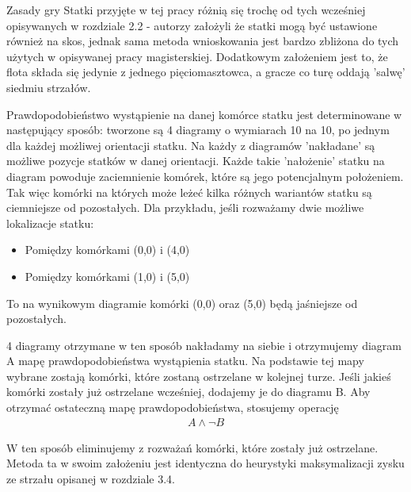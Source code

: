 Zasady gry Statki przyjęte w tej pracy różnią się trochę od tych wcześniej opisywanych w rozdziale 2.2 - autorzy założyli że statki mogą być ustawione również na skos, jednak sama metoda wnioskowania jest bardzo zbliżona do tych użytych w opisywanej pracy magisterskiej. Dodatkowym założeniem jest to, że flota składa się jedynie z jednego pięciomasztowca, a gracze co turę oddają 'salwę' siedmiu strzałów.

Prawdopodobieństwo wystąpienie na danej komórce statku jest determinowane w następujący sposób: tworzone są 4 diagramy o wymiarach 10 na 10, po jednym dla każdej możliwej orientacji statku. Na każdy z diagramów 'nakładane' są możliwe pozycje statków w danej orientacji. Każde takie 'nałożenie' statku na diagram powoduje zaciemnienie komórek, które są jego potencjalnym położeniem. Tak więc komórki na których może leżeć kilka różnych wariantów statku są ciemniejsze od pozostałych. Dla przykładu, jeśli rozważamy dwie możliwe lokalizacje statku:
\begin{itemize}
    \item Pomiędzy komórkami (0,0) i (4,0)
    \item Pomiędzy komórkami (1,0) i (5,0)
\end{itemize}
To na wynikowym diagramie komórki (0,0) oraz (5,0) będą jaśniejsze od pozostałych.

4 diagramy otrzymane w ten sposób nakładamy na siebie i otrzymujemy diagram A mapę prawdopodobieństwa wystąpienia statku. Na podstawie tej mapy wybrane zostają komórki, które zostaną ostrzelane w kolejnej turze. Jeśli jakieś komórki zostały już ostrzelane wcześniej, dodajemy je do diagramu B. Aby otrzymać ostateczną mapę prawdopodobieństwa, stosujemy operację
\begin{align*}
    A \land \neg B
\end{align*}

W ten sposób eliminujemy z rozważań komórki, które zostały już ostrzelane. Metoda ta w swoim założeniu jest identyczna do heurystyki maksymalizacji zysku ze strzału opisanej w rozdziale 3.4.

